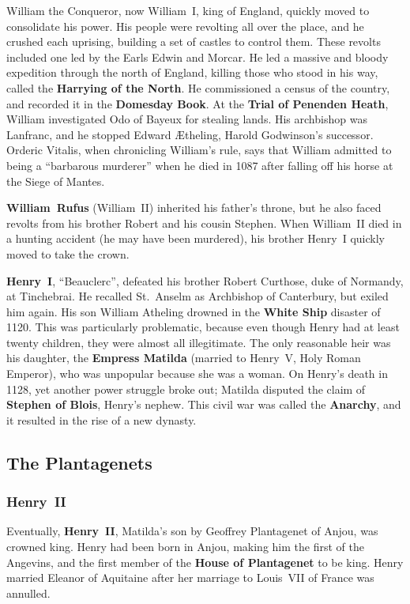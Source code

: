 William the Conqueror, now William~I, king of England, quickly moved to consolidate his power.
His people were revolting all over the place, and he crushed each uprising,
building a set of castles to control them.
These revolts included one led by the Earls Edwin and Morcar.
He led a massive and bloody expedition through the north of England,
killing those who stood in his way, called the \textbf{Harrying of the North}.
He commissioned a census of the country, and recorded it in the \textbf{Domesday Book}.
At the \textbf{Trial of Penenden Heath}, William investigated Odo of Bayeux for stealing lands.
His archbishop was Lanfranc, and he stopped Edward \AE{}theling, Harold Godwinson's successor.
Orderic Vitalis, when chronicling William's rule, says that William admitted to being a ``barbarous murderer''
when he died in 1087 after falling off his horse at the Siege of Mantes.

\textbf{William~Rufus} (William~II) inherited his father's throne,
but he also faced revolts from his brother Robert and his cousin Stephen.
When William~II died in a hunting accident (he may have been murdered),
his brother Henry~I quickly moved to take the crown.

\textbf{Henry~I}, ``Beauclerc'', defeated his brother Robert Curthose, duke of Normandy, at Tinchebrai.
He recalled St.\ Anselm as Archbishop of Canterbury, but exiled him again.
His son William Atheling drowned in the \textbf{White Ship} disaster of 1120.
This was particularly problematic,
because even though Henry had at least twenty children, they were almost all illegitimate.
The only reasonable heir was his daughter, the \textbf{Empress Matilda} (married to Henry~V, Holy Roman Emperor),
who was unpopular because she was a woman.
On Henry's death in 1128, yet another power struggle broke out;
Matilda disputed the claim of \textbf{Stephen of Blois}, Henry's nephew.
This civil war was called the \textbf{Anarchy}, and it resulted in the rise of a new dynasty.

\subsection*{The Plantagenets}

\subsubsection*{Henry~II}

Eventually, \textbf{Henry~II}, Matilda's son by Geoffrey Plantagenet of Anjou, was crowned king.
Henry had been born in Anjou, making him the first of the Angevins,
and the first member of the \textbf{House of Plantagenet} to be king.
Henry married Eleanor of Aquitaine after her marriage to Louis~VII of France was annulled.

